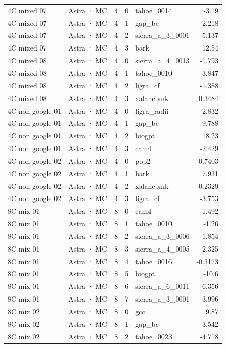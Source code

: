 \begin{tabular}{llrrlr}
4C mixed 07 & Astra · MC & 4 & 0 & tahoe\_0014 & -3.19 \\
4C mixed 07 & Astra · MC & 4 & 1 & gap\_bc & -2.218 \\
4C mixed 07 & Astra · MC & 4 & 2 & sierra\_a\_3\_0001 & -5.137 \\
4C mixed 07 & Astra · MC & 4 & 3 & bark & 12.54 \\
4C mixed 08 & Astra · MC & 4 & 0 & sierra\_a\_4\_0013 & -1.793 \\
4C mixed 08 & Astra · MC & 4 & 1 & tahoe\_0010 & 3.847 \\
4C mixed 08 & Astra · MC & 4 & 2 & ligra\_cf & -1.388 \\
4C mixed 08 & Astra · MC & 4 & 3 & xalancbmk & 0.3484 \\
4C non google 01 & Astra · MC & 4 & 0 & ligra\_radii & -2.832 \\
4C non google 01 & Astra · MC & 4 & 1 & gap\_bc & -9.788 \\
4C non google 01 & Astra · MC & 4 & 2 & biogpt & 18.23 \\
4C non google 01 & Astra · MC & 4 & 3 & cam4 & -2.429 \\
4C non google 02 & Astra · MC & 4 & 0 & pop2 & -0.7403 \\
4C non google 02 & Astra · MC & 4 & 1 & bark & 7.931 \\
4C non google 02 & Astra · MC & 4 & 2 & xalancbmk & 0.2329 \\
4C non google 02 & Astra · MC & 4 & 3 & ligra\_cf & -3.753 \\
8C mix 01 & Astra · MC & 8 & 0 & cam4 & -1.492 \\
8C mix 01 & Astra · MC & 8 & 1 & tahoe\_0010 & -1.26 \\
8C mix 01 & Astra · MC & 8 & 2 & sierra\_a\_3\_0006 & -1.854 \\
8C mix 01 & Astra · MC & 8 & 3 & sierra\_a\_4\_0005 & -2.325 \\
8C mix 01 & Astra · MC & 8 & 4 & tahoe\_0016 & -0.3173 \\
8C mix 01 & Astra · MC & 8 & 5 & biogpt & -10.6 \\
8C mix 01 & Astra · MC & 8 & 6 & sierra\_a\_6\_0011 & -6.356 \\
8C mix 01 & Astra · MC & 8 & 7 & sierra\_a\_3\_0001 & -3.996 \\
8C mix 02 & Astra · MC & 8 & 0 & gcc & 9.87 \\
8C mix 02 & Astra · MC & 8 & 1 & gap\_bc & -3.542 \\
8C mix 02 & Astra · MC & 8 & 2 & tahoe\_0023 & -4.718 \\

\end{tabular}
